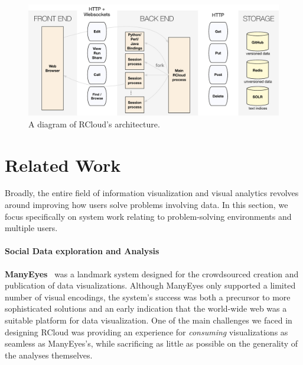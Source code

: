 \begin{figure}
\centering
\includegraphics[width=.75\linewidth]{fig/system/system.pdf}
\caption{\label{fig:system}A diagram of RCloud's architecture. }
\end{figure}

\section{Related Work\label{sec:related}}

Broadly, the entire field of information visualization and visual analytics
revolves around improving how users solve problems involving data.
In this section, we focus specifically on
system work relating to problem-solving environments and multiple users.

\paragraph*{Social Data exploration and Analysis}
{\bf ManyEyes}~\cite{Viegas:2007:MAS} was a landmark system designed
for the crowdsourced creation and publication of data
visualizations. Although ManyEyes only supported a limited number of
visual encodings, the system's success was both a precursor to more
sophisticated solutions and an early indication that the world-wide
web was a suitable platform for data visualization. One of the main
challenges we faced in designing RCloud was providing an experience
for \emph{consuming} visualizations as seamless as ManyEyes's, while
sacrificing as little as possible on the generality of the analyses
themselves.

